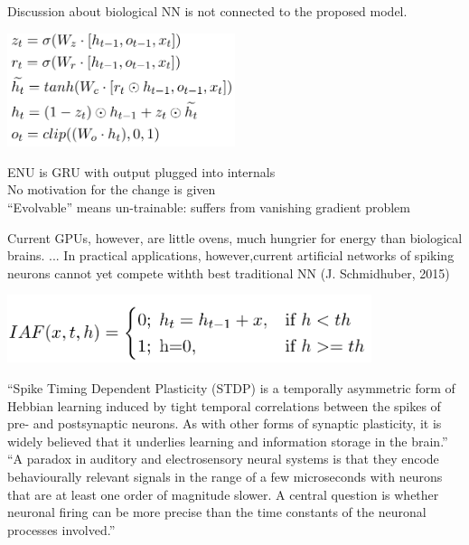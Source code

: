 \documentclass[aspectratio=169,8pt]{beamer}
\begin{document}
Discussion about biological NN is not connected to the proposed model.
\eframe

\begin{center}
  \includegraphics[width=0.50\textwidth]{i/eq.png}
\end{center}
ENU is GRU with output plugged into internals \\
No motivation for the change is given \\
``Evolvable'' means un-trainable: suffers from vanishing gradient problem
\eframe


Current GPUs, however, are little ovens, much
hungrier for energy than biological brains.
...
In practical applications, however,current artificial networks of
spiking neurons cannot yet compete withth best traditional NN
(J. Schmidhuber, 2015)

\begin{center}
  \includegraphics[width=0.80\textwidth]{i/iaf.png}
\end{center}
\eframe


``Spike Timing Dependent Plasticity (STDP) is a temporally asymmetric
form of Hebbian learning induced by tight temporal correlations
between the spikes of pre- and postsynaptic neurons. As with other
forms of synaptic plasticity, it is widely believed that it underlies
learning and information storage in the brain.''
\\
``A paradox in auditory and electrosensory neural systems is that they
encode behaviourally relevant signals in the range of a few
microseconds with neurons that are at least one order of magnitude
slower. A central question is whether neuronal firing can be more
precise than the time constants of the neuronal processes involved.''
\end{document}
